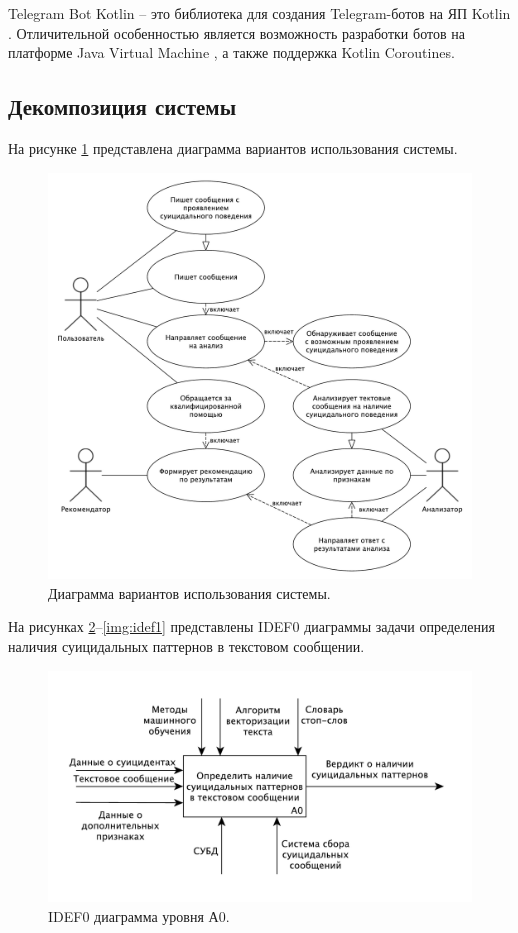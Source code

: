 Telegram Bot Kotlin -- это библиотека для создания Telegram-ботов на ЯП Kotlin \cite{Kotlin}. Отличительной особенностью является возможность разработки ботов на платформе Java Virtual Machine \cite{jvm}, а также поддержка Kotlin Coroutines. \cite{kotlinTelegram}

\subsection{Декомпозиция системы}

На рисунке \ref{img:useCase} представлена диаграмма вариантов использования системы.

\begin{figure}[H]
	\centering
	\includegraphics[width=\textwidth]{inc/useCase.pdf}
	\caption{ Диаграмма вариантов использования системы. }
	\label{img:useCase}
\end{figure}

На рисунках \ref{img:idef0}--\ref{img:idef1} представлены IDEF0 диаграммы задачи определения наличия суицидальных паттернов в текстовом сообщении.

\begin{figure}[H]
	\centering
	\includegraphics[width=\textwidth]{inc/A0.pdf}
	\caption{ IDEF0 диаграмма уровня А0. }
	\label{img:idef0}
\end{figure}


